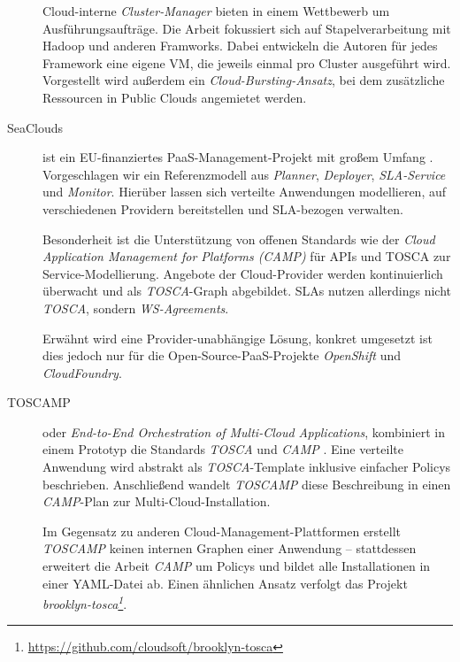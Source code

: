 \begin{description}
	Cloud-interne \emph{Cluster-Manager} bieten in einem Wettbewerb um Ausführungsaufträge. Die Arbeit fokussiert sich auf Stapelverarbeitung mit Hadoop und anderen Framworks. Dabei entwickeln die Autoren für jedes Framework eine eigene VM, die jeweils einmal pro Cluster ausgeführt wird. Vorgestellt wird außerdem ein \emph{Cloud-Bursting-Ansatz}, bei dem zusätzliche Ressourcen in Public Clouds angemietet werden.
	
	
	\item[SeaClouds] ist ein EU-finanziertes PaaS-Management-Projekt mit großem Umfang \cite{seaclouds:2015:architecture}. Vorgeschlagen wir ein Referenzmodell aus \emph{Planner}, \emph{Deployer}, \emph{SLA-Service} und \emph{Monitor}. Hierüber lassen sich verteilte Anwendungen modellieren, auf verschiedenen Providern bereitstellen und SLA-bezogen verwalten.
	
	Besonderheit ist die Unterstützung von offenen Standards wie der \emph{Cloud Application Management for Platforms (CAMP)} für APIs und TOSCA zur Service-Modellierung. Angebote der Cloud-Provider werden kontinuierlich überwacht und als \emph{TOSCA}-Graph abgebildet. SLAs nutzen allerdings nicht \emph{TOSCA}, sondern \emph{WS-Agreements}.
		
	Erwähnt wird eine Provider-unabhängige Lösung, konkret umgesetzt ist dies jedoch nur für die Open-Source-PaaS-Projekte \emph{OpenShift} und \emph{CloudFoundry}.
	
	\item[TOSCAMP] oder \emph{End-to-End Orchestration of
	Multi-Cloud Applications}, kombiniert in einem Prototyp die Standards \emph{TOSCA} und \emph{CAMP} \cite{korte:2017:toscamp}. Eine verteilte Anwendung wird abstrakt als \emph{TOSCA}-Template inklusive einfacher Policys beschrieben. Anschließend wandelt \emph{TOSCAMP} diese Beschreibung in einen \emph{CAMP}-Plan zur Multi-Cloud-Installation.

	Im Gegensatz zu anderen Cloud-Management-Plattformen erstellt \emph{TOSCAMP} keinen internen Graphen einer Anwendung -- stattdessen erweitert die Arbeit \emph{CAMP} um Policys und bildet alle Installationen in einer YAML-Datei ab. Einen ähnlichen Ansatz verfolgt das Projekt \emph{brooklyn-tosca\footnote{\url{https://github.com/cloudsoft/brooklyn-tosca}}}.
	
%	
%	
%	
	
\end{description}

